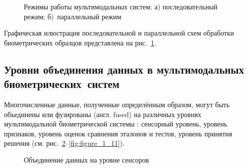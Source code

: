 \documentclass[12pt]{book}
\begin{document}
{{}

\begin{figure}[h]
\caption{Режимы работы мультимодальных систем: а) последовательный режим; б)~параллельный режим}
\label{fig:figure_1_7}
\end{figure}

\large{Графическая илюстрация последовательной и параллельной схем обработки биометрических образцов представлена на рис.~\ref{fig:figure_1_7}.}

\subsection{Уровни объединения данных в мультимодальных биометрических~систем}

\large{Многочисленные данные, полученные определённым образом, могут быть объединены или фузированы (англ. fused) на различных уровнях мультимодальной биометрической системы \cite{unar_2014, dahea_2018}: сенсорный уровень, уровень признаков, уровень оценок сравнения эталонов и тестов, уровень принятия решения (см. рис.~\ref{fig:figure_1_8}--\ref{fig:figure_1_11}).}

\begin{figure}[h]
\caption{Объединение данных на уровне сенсоров}
\label{fig:figure_1_8}
\end{figure}

}
\end{document}
